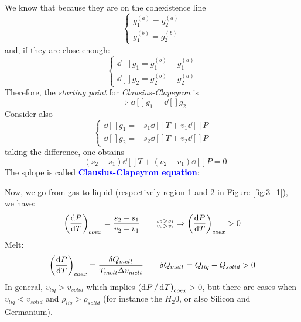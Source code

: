 \documentclass[../main/main.tex]{subfiles}
\begin{document}
\noindent We know that because they are on the cohexistence line
\begin{equation}
  \begin{cases}
   g_1^{(a)} = g_2^{(a)}\\
   g_1^{(b)} = g_2^{(b)}
  \end{cases}
\label{eq:}
\end{equation}
and, if they are close enough:
\begin{equation}
  \begin{cases}
  \dd[]{g_1} = g_1^{(b)} - g_1^{(a)} \\
  \dd[]{g_2} = g_2^{(b)} - g_2^{(a)}
  \end{cases}
\label{eq:}
\end{equation}
Therefore, the \emph{starting point} for \emph{Clausius-Clapeyron} is
\begin{equation}
  \Rightarrow \dd[]{g_1} =\dd[]{g_2}
  \label{eq:}
\end{equation}
Consider also
\begin{equation}
  \begin{cases}
   \dd[]{g_1} = -s_1 \dd[]{T} + v_1 \dd[]{P}   \\
   \dd[]{g_2} = -s_2 \dd[]{T} + v_2 \dd[]{P}
  \end{cases}
\label{eq:}
\end{equation}
taking the difference, one obtains
\begin{equation}
  -(s_2 - s_1) \dd[]{T} + (v_2 - v_1) \dd[]{P} = 0
  \label{eq:}
\end{equation}
The splope is called \textcolor{blue}{\textbf{Clausius-Clapeyron equation}}:

 Now, we go from gas to liquid (respectively region 1 and 2 in Figure \ref{fig:3_1}), we have:
\begin{equation}
  \qty(\dv{P}{T} )_{coex} = \frac{s_2 - s_1}{v_2 - v_1} \qquad \substack{ s_2 > s_1 \\ v_2 > v_1} \Rightarrow \qty(\dv{P}{T} )_{coex} > 0
  \label{eq:}
\end{equation}
Melt:
\begin{equation}
  \qty(\dv{P}{T} )_{coex} = \frac{\delta Q_{melt}}{T_{melt}\Delta v_{melt}} \qquad \delta Q_{melt} = Q_{liq} - Q_{solid} > 0
  \label{eq:}
\end{equation}
In general, \( v_{liq} > v_{solid} \) which implies \( \qty( \dd[]{P}/\dd[]{T}   )_{coex} > 0  \), but there are cases when \( v_{liq} < v_{solid} \) and \( \rho_{liq} > \rho _{solid} \) (for instance the \( H_2 0 \), or also Silicon and Germanium).
\end{document}
